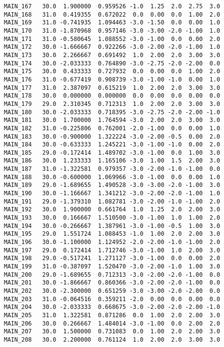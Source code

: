 \documentclass[a4paper,10pt,onecolumn,oneside,openright]{article}
\begin{document}
\begin{verbatim}
MAIN_167   30.0  1.900000  0.959526 -1.0  1.25  2.0  2.75  3.0
MAIN_168   31.0  0.419355  0.672022  0.0  0.00  0.0  1.00  2.0
MAIN_169   31.0 -0.741935  1.094463 -3.0 -1.50  0.0  0.00  1.0
MAIN_170   31.0 -1.870968  0.957146 -3.0 -3.00 -2.0 -1.00  1.0
MAIN_171   31.0 -0.580645  1.088552 -3.0 -1.00  0.0  0.00  2.0
MAIN_172   30.0 -1.666667  0.922266 -3.0 -2.00 -2.0 -1.00  1.0
MAIN_173   30.0  2.266667  0.691492  1.0  2.00  2.0  3.00  3.0
MAIN_174   30.0 -2.033333  0.764890 -3.0 -2.75 -2.0 -2.00  0.0
MAIN_175   30.0  0.433333  0.727932  0.0  0.00  0.0  1.00  2.0
MAIN_176   31.0 -0.677419  0.908739 -3.0 -1.00 -1.0  0.00  1.0
MAIN_177   31.0  2.387097  0.615219  1.0  2.00  2.0  3.00  3.0
MAIN_178   30.0  0.000000  0.000000  0.0  0.00  0.0  0.00  0.0
MAIN_179   29.0  2.310345  0.712313  1.0  2.00  2.0  3.00  3.0
MAIN_180   30.0 -2.033333  0.718395 -3.0 -2.75 -2.0 -2.00 -1.0
MAIN_181   30.0  1.700000  1.764594 -3.0  2.00  2.0  3.00  3.0
MAIN_182   31.0 -0.225806  0.762001 -2.0 -1.00  0.0  0.00  1.0
MAIN_183   30.0 -0.900000  1.322224 -3.0 -2.00 -0.5  0.00  2.0
MAIN_184   30.0 -0.633333  1.245221 -3.0 -1.00 -1.0  0.00  2.0
MAIN_185   29.0 -0.172414  1.489702 -3.0 -1.00  0.0  1.00  3.0
MAIN_186   30.0  1.233333  1.165106 -3.0  1.00  1.5  2.00  3.0
MAIN_187   31.0 -1.322581  0.979357 -3.0 -2.00 -1.0 -1.00  0.0
MAIN_188   30.0 -0.600000  1.069966 -3.0 -1.00  0.0  0.00  1.0
MAIN_189   29.0 -1.689655  1.490528 -3.0 -3.00 -2.0 -1.00  3.0
MAIN_190   30.0 -1.166667  1.341212 -3.0 -2.00 -2.0 -1.00  1.0
MAIN_191   29.0 -1.379310  1.082781 -3.0 -2.00 -1.0 -1.00  2.0
MAIN_192   30.0  1.900000  0.661764  1.0  1.25  2.0  2.00  3.0
MAIN_193   30.0  0.166667  1.510500 -3.0 -1.00  1.0  1.00  2.0
MAIN_194   30.0 -0.266667  1.387961 -3.0 -1.00 -0.5  1.00  3.0
MAIN_195   29.0  1.551724  1.088453 -1.0  1.00  2.0  2.00  3.0
MAIN_196   30.0 -1.100000  1.124952 -2.0 -2.00 -1.0 -1.00  2.0
MAIN_197   29.0  0.172414  1.712746 -3.0 -1.00  1.0  2.00  3.0
MAIN_198   29.0 -0.517241  1.271127 -3.0 -1.00  0.0  0.00  2.0
MAIN_199   31.0 -0.387097  1.520470 -3.0 -2.00 -1.0  1.00  3.0
MAIN_200   29.0 -1.689655  0.712313 -3.0 -2.00 -2.0 -1.00  0.0
MAIN_201   30.0 -1.866667  0.860366 -3.0 -2.00 -2.0 -1.00  0.0
MAIN_202   30.0 -2.300000  0.651259 -3.0 -3.00 -2.0 -2.00  0.0
MAIN_203   31.0 -0.064516  0.359211 -2.0  0.00  0.0  0.00  0.0
MAIN_204   30.0 -2.033333  0.668675 -3.0 -2.00 -2.0 -2.00 -1.0
MAIN_205   31.0  1.322581  0.871286  0.0  1.00  2.0  2.00  3.0
MAIN_206   30.0  0.266667  1.484014 -3.0 -1.00  0.0  2.00  2.0
MAIN_207   30.0  1.500000  0.731083  0.0  1.00  2.0  2.00  3.0
MAIN_208   30.0  2.200000  0.761124  1.0  2.00  2.0  3.00  3.0

\end{verbatim}
\end{document}
